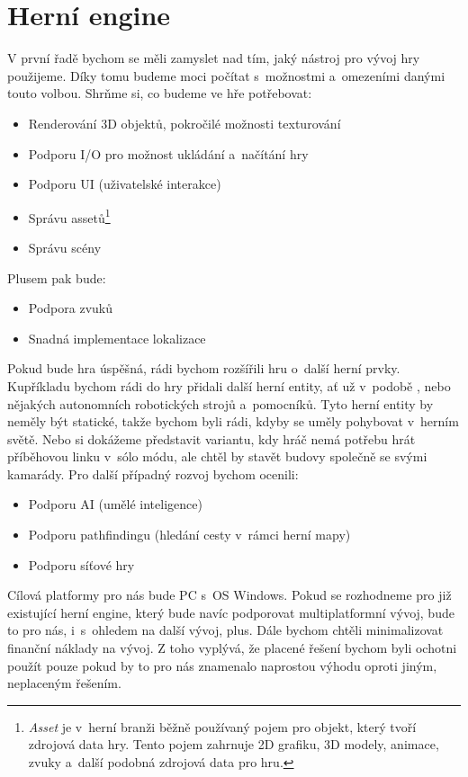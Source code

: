 
\section{Herní engine}
V první řadě bychom se měli zamyslet nad tím, jaký nástroj pro vývoj hry použijeme. Díky tomu budeme moci počítat s~možnostmi a~omezeními danými touto volbou. Shrňme si, co budeme ve hře potřebovat:

\begin{itemize}
	\item Renderování 3D objektů, pokročilé možnosti texturování
	\item Podporu I/O pro možnost ukládání a~načítání hry
	\item Podporu UI (uživatelské interakce)
	\item Správu assetů\footnote{\textit{Asset} je v~herní branži běžně používaný pojem pro objekt, který tvoří zdrojová data hry. Tento pojem zahrnuje 2D grafiku, 3D modely, animace, zvuky a~další podobná zdrojová data pro hru.}
	\item Správu scény
\end{itemize}

Plusem pak bude:

\begin{itemize}
	\item Podpora zvuků
	\item Snadná implementace lokalizace
\end{itemize}

Pokud bude hra úspěšná, rádi bychom rozšířili hru o~další herní prvky. Kupříkladu bychom rádi do hry přidali další herní entity, ať už v~podobě \NPC{}, nebo nějakých autonomních robotických strojů a~pomocníků. Tyto herní entity by neměly být statické, takže bychom byli rádi, kdyby se uměly pohybovat v~herním světě. Nebo si dokážeme představit variantu, kdy hráč nemá potřebu hrát příběhovou linku v~sólo módu, ale chtěl by stavět budovy společně se svými kamarády. Pro další případný rozvoj bychom ocenili:

\begin{itemize}
	\item Podporu AI (umělé inteligence)
	\item Podporu pathfindingu (hledání cesty v~rámci herní mapy)
	\item Podporu síťové hry
\end{itemize}

Cílová platformy pro nás bude PC s~OS Windows. Pokud se rozhodneme pro již existující herní engine, který bude navíc podporovat multiplatformní vývoj, bude to pro nás, i~s~ohledem na další vývoj, plus. Dále bychom chtěli minimalizovat finanční náklady na vývoj. Z toho vyplývá, že placené řešení bychom byli ochotni použít pouze pokud by to pro nás znamenalo naprostou výhodu oproti jiným, neplaceným řešením.

